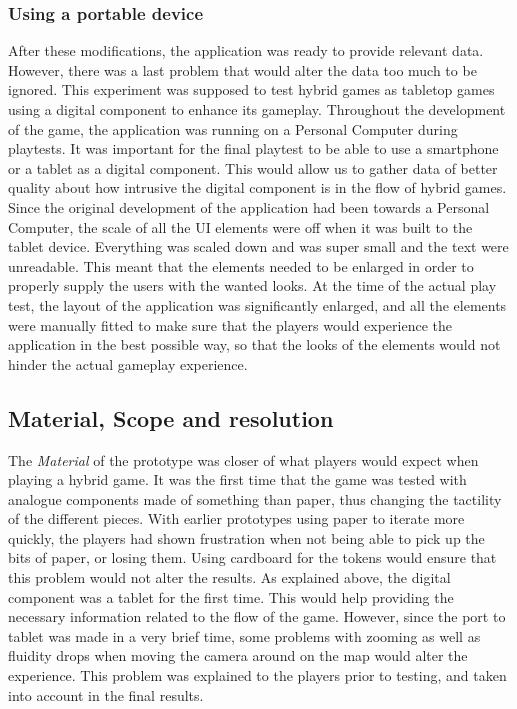 \subsubsection{Using a portable device}
After these modifications, the application was ready to provide relevant data. However, there was a last problem that would alter the data too much to be ignored. This experiment was supposed to test hybrid games as tabletop games using a digital component to enhance its gameplay. Throughout the development of the game, the application was running on a Personal Computer during playtests. It was important for the final playtest to be able to use a smartphone or a tablet as a digital component. This would allow us to gather data of better quality about how intrusive the digital component is in the flow of hybrid games.  
Since the original development of the application had been towards a Personal Computer, the scale of all the UI elements were off when it was built to the tablet device. Everything was scaled down and was super small and the text were unreadable. This meant that the elements needed to be enlarged in order to properly supply the users with the wanted looks. At the time of the actual play test, the layout of the application was significantly enlarged, and all the elements were manually fitted to make sure that the players would experience the application in the best possible way, so that the looks of the elements would not hinder the actual gameplay experience.

\subsection{Material, Scope and resolution}
The \textit{Material} of the prototype was closer of what players would expect when playing a hybrid game. It was the first time that the game was tested with analogue components made of something than paper, thus changing the tactility of the different pieces. With earlier prototypes using paper to iterate more quickly, the players had shown frustration when not being able to pick up the bits of paper, or losing them. Using cardboard for the tokens would ensure that this problem would not alter the results. As explained above, the digital component was a tablet for the first time. This would help providing the necessary information related to the flow of the game. However, since the port to tablet was made in a very brief time, some problems with zooming as well as fluidity drops when moving the camera around on the map would alter the experience. This problem was explained to the players prior to testing, and taken into account in the final results.

